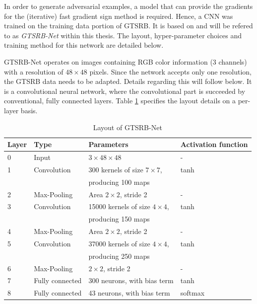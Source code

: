 \documentclass[11pt, a4paper]{article}
\begin{document}

In order to generate adversarial examples, a model that can provide the gradients for the (iterative) fast gradient sign method is required. Hence, a CNN was trained on the training data portion of GTSRB. It is based on \cite{multi-column-neural-network-gtsrb} and will be refered to as \emph{GTSRB-Net} within this thesis. The layout, hyper-parameter choices and training method for this network are detailed below.

GTSRB-Net operates on images containing RGB color information (3 channels) with a resolution of $48 \times 48$ pixels. Since the network accepts only one resolution, the GTSRB data needs to be adapted. Details regarding this will follow below. It is a convolutional neural network, where the convolutional part is succeeded by conventional, fully connected layers. Table \ref{tab:gtsrb-layout} specifies the layout details on a per-layer basis.

\begin{table}[htb]
	\centering
	\begin{tabular}{|l|lll|}
		\hline
		Layer & Type & Parameters & Activation function \\
		\hline
		0 & Input & $3 \times 48 \times 48$ & - \\
		1 & Convolution & 300 kernels of size $7 \times 7$, & tanh \\
		& & producing 100 maps & \\
		2 & Max-Pooling & Area $2\times 2$, stride 2 & - \\
		3 & Convolution & 15000 kernels of size $4 \times 4$, & tanh \\
		& & producing 150 maps & \\
		4 & Max-Pooling & Area $2\times 2$, stride 2 & - \\
		5 & Convolution & 37000 kernels of size $4 \times 4$, & tanh \\
		& & producing 250 maps & \\
		6 & Max-Pooling & $2\times 2$, stride 2 & - \\
		7 & Fully connected & 300 neurons, with bias term & tanh \\
		8 & Fully connected & 43 neurons, with bias term & softmax \\
		\hline
	\end{tabular}
	\caption{Layout of GTSRB-Net}
	\label{tab:gtsrb-layout}
\end{table}
\end{document}
